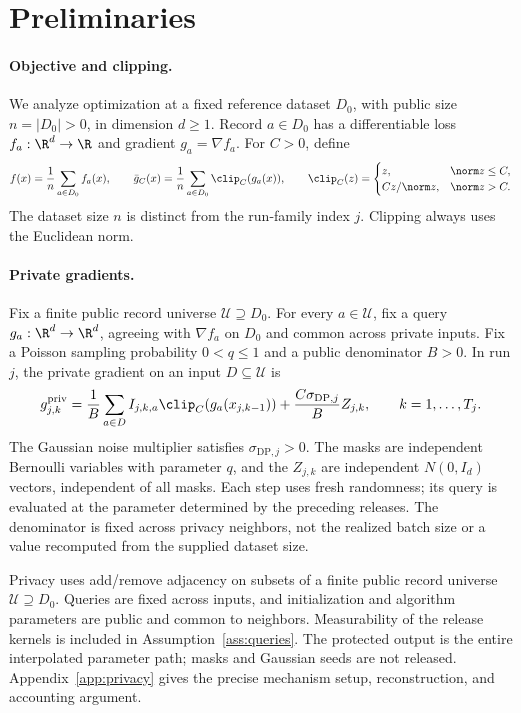 \section{Preliminaries}

\paragraph{Objective and clipping.}
We analyze optimization at a fixed reference dataset $D_0$, with public
size $n=|D_0|>0$, in dimension $d\geq1$. Record $a\in D_0$ has a differentiable
loss $f_a:\R^d\to\R$ and gradient $g_a=\nabla f_a$. For $C>0$, define
\[
 f(x)=\frac1n\sum_{a\in D_0}f_a(x),\qquad
 \bar g_C(x)=\frac1n\sum_{a\in D_0}\clip_C(g_a(x)),
 \qquad
 \clip_C(z)=
 \begin{cases}
 z,&\norm z\leq C,\\
 Cz/\norm z,&\norm z>C.
 \end{cases}
\]
The dataset size $n$ is distinct from the run-family index $j$.
Clipping always uses the Euclidean norm.

\paragraph{Private gradients.}
Fix a finite public record universe $\mathcal U\supseteq D_0$. For every
$a\in\mathcal U$, fix a query $g_a:\R^d\to\R^d$, agreeing with
$\nabla f_a$ on $D_0$ and common across private inputs.
Fix a Poisson sampling probability $0<q\leq1$ and a public denominator
$B>0$. In run $j$, the private gradient on an input $D\subseteq\mathcal U$ is
\begin{equation}\label{eq:private-gradient}
 g^{\mathrm{priv}}_{j,k}
 =\frac1B\sum_{a\in D}I_{j,k,a}
       \clip_C(g_a(x_{j,k-1}))
       +\frac{C\sigma_{\mathrm{DP},j}}B Z_{j,k},
 \qquad k=1,\ldots,T_j.
\end{equation}
The Gaussian noise multiplier satisfies $\sigma_{\mathrm{DP},j}>0$.
The masks are independent Bernoulli variables with parameter $q$, and the
$Z_{j,k}$ are independent $N(0,I_d)$ vectors, independent of all masks.
Each step uses fresh randomness; its query is evaluated at the parameter
determined by the preceding releases. The denominator is fixed across
privacy neighbors, not the realized batch size or a value recomputed from
the supplied dataset size.

Privacy uses add/remove adjacency on subsets of a finite public record
universe $\mathcal U\supseteq D_0$. Queries are fixed across inputs, and
initialization and algorithm parameters are public and common to
neighbors. Measurability of the release kernels is included in
Assumption~\ref{ass:queries}. The protected output is the
entire interpolated parameter path; masks and Gaussian seeds are not
released. Appendix~\ref{app:privacy} gives the precise mechanism setup,
reconstruction, and accounting argument.

